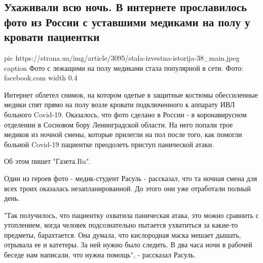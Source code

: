  
 
 
 
 
 
\subsection{Ухаживали всю ночь. В интернете прославилось фото из России с уставшими медиками на полу у кровати пациентки}
\label{sec:30_12_2020.news.ua.strana.1.uhazhivali_vsu_noch_mediki}

\ifcmt
  pic https://strana.ua/img/article/3095/stala-izvestna-istorija-38_main.jpeg
	caption Фото с лежащими на полу медиками стала популярной в сети. Фото: facebook.com
  width 0.4
\fi

Интернет облетел снимок, на котором одетые в защитные костюмы обессиленные
медики спят прямо на полу возле кровати подключенного к аппарату ИВЛ больного
Covid-19. Оказалось, что фото сделано в России - в коронавирусном отделении в
Сосновом бору Ленинградской области. На него попали трое медиков из ночной
смены, которые прилегли на пол после того, как помогли больной Covid-19
пациентке преодолеть приступ панической атаки.

Об этом пишет "Газета.Ru".

Один из героев фото - медик-студент Расуль - рассказал, что та ночная смена для
всех троих оказалась незапланированной. До этого они уже отработали полный
день.

"Так получилось, что пациентку охватила паническая атака, это можно сравнить с
утоплением, когда человек подсознательно пытается ухватиться за какие-то
предметы, барахтается. Она думала, что кислородная маска мешает дышать,
отрывала ее и катетеры. За ней нужно было следить. В два часа ночи в рабочей
беседе нам написали, что нужна помощь", - рассказал Расуль.

